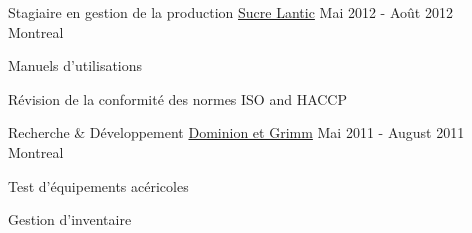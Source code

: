 \begin{cventries}
  \cventry
    {Stagiaire en gestion de la production} %
    {\href{https://www.lanticrogers.com/}{Sucre Lantic}} %
    {Mai 2012 - Août 2012} %
    {Montreal} %
    {
      \begin{cvitems} %
        \item {Manuels d'utilisations}
        \item {Révision de la conformité des normes ISO and HACCP}
      \end{cvitems}
    }

\end{cventries}

\newpage
{}


\begin{cventries}

  \cventry
  {Recherche \& Développement} %
  {\href{https://www.dominiongrimm.ca/en/home.html}{Dominion et Grimm}} %
    {Mai 2011 - August 2011} %
    {Montreal} %
    {
      \begin{cvitems} %
        \item {Test d'équipements acéricoles}
        \item {Gestion d'inventaire}
      \end{cvitems}
    }

\end{cventries}
